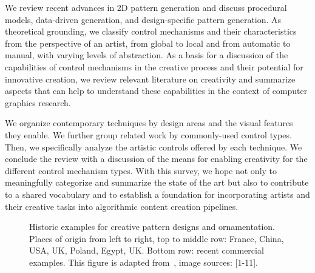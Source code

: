 We review recent advances in 2D pattern generation and discuss procedural models, data-driven generation, and design-specific pattern generation. As theoretical grounding, we classify control mechanisms and their characteristics from the perspective of an artist, from global to local and from automatic to manual, with varying levels of abstraction. As a basis for a discussion of the capabilities of control mechanisms in the creative process and their potential for innovative creation, we review relevant literature on creativity and summarize aspects that can help to understand these capabilities in the context of computer graphics research.

We organize contemporary techniques by design areas and the visual features they enable. We further group related work by commonly-used control types. Then, we specifically analyze the artistic controls offered by each technique. 
We conclude the review with a discussion of the means for enabling creativity for the different control mechanism types. With this survey, we hope not only to meaningfully categorize and summarize the state of the art but also to contribute to a shared vocabulary and to establish a foundation for incorporating artists and their creative tasks into algorithmic content creation pipelines.

\begin{figure}
        \caption[Historic pattern examples]{\label{fig:historic_examples} Historic examples for creative pattern designs and ornamentation. Places of origin from left to right, top to middle row:  France, China, USA, UK, Poland, Egypt, UK. Bottom row: recent commercial examples. This figure is adapted from~\cite{gieseke_2017_ooo}, image sources: [1-11].}
\end{figure}
